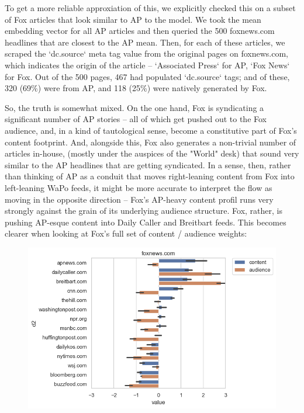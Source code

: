 \documentclass{scrartcl}
\begin{document}
To get a more reliable approxiation of this, we explicitly checked this on a subset of Fox articles that look similar to AP to the model. We took the mean embedding vector for all AP articles and then queried the 500 foxnews.com headlines that are closest to the AP mean. Then, for each of these articles, we scraped the `dc.source` meta tag value from the original pages on foxnews.com, which indicates the origin of the article -- `Associated Press` for AP, `Fox News` for Fox. Out of the 500 pages, 467 had populated `dc.source` tags; and of these, 320 (69\%) were from AP, and 118 (25\%) were natively generated by Fox.

So, the truth is somewhat mixed. On the one hand, Fox is syndicating a significant number of AP stories -- all of which get pushed out to the Fox audience, and, in a kind of tautological sense, become a constitutive part of Fox's content footprint. And, alongside this, Fox also generates a non-trivial number of articles in-house, (mostly under the auspices of the "World" desk) that sound very similar to the AP headlines that are getting syndicated. In a sense, then, rather than thinking of AP as a conduit that moves right-leaning content from Fox into left-leaning WaPo feeds, it might be more accurate to interpret the flow as moving in the opposite direction -- Fox's AP-heavy content profil runs very strongly against the grain of its underlying audience structure. Fox, rather, is pushing AP-esque content into Daily Caller and Breitbart feeds. This becomes clearer when looking at Fox's full set of content / audience weights:

\begin{figure}[H]
  \centering
  \includegraphics[width=\textwidth]{figures/ca-foxnews-composite.png}
\end{figure}
\end{document}

